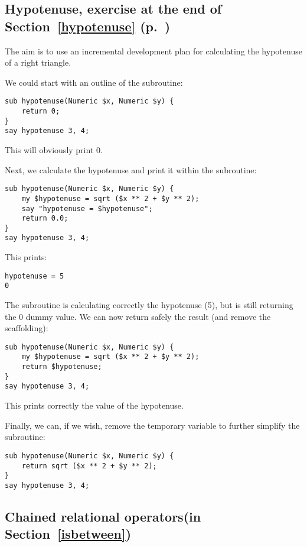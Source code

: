 \subsection{Hypotenuse, exercise at the end of Section~\ref{hypotenuse} (p.~\pageref{hypotenuse})}
\label{sol_hypotenuse}

The aim is to use an incremental development plan for 
calculating the hypotenuse of a right triangle. 

We could start with an outline of the subroutine:

\begin{verbatim}
sub hypotenuse(Numeric $x, Numeric $y) {
    return 0;
}
say hypotenuse 3, 4;
\end{verbatim}
%

This will obviously print 0.

Next, we calculate the hypotenuse and print it within the subroutine:

\begin{verbatim}
sub hypotenuse(Numeric $x, Numeric $y) {
    my $hypotenuse = sqrt ($x ** 2 + $y ** 2);
    say "hypotenuse = $hypotenuse";
    return 0.0;
}
say hypotenuse 3, 4;
\end{verbatim}
%

This prints:

\begin{verbatim}
hypotenuse = 5
0
\end{verbatim}
%

The subroutine is calculating correctly the hypotenuse (5), 
but is still returning the 0 dummy value. We can now return 
safely the result (and remove the scaffolding):

\begin{verbatim}
sub hypotenuse(Numeric $x, Numeric $y) {
    my $hypotenuse = sqrt ($x ** 2 + $y ** 2);
    return $hypotenuse;
}
say hypotenuse 3, 4;
\end{verbatim}
%

This prints correctly the value of the hypotenuse.

Finally, we can, if we wish, remove the temporary variable 
to further simplify the subroutine:
\begin{verbatim}
sub hypotenuse(Numeric $x, Numeric $y) {
    return sqrt ($x ** 2 + $y ** 2);
}
say hypotenuse 3, 4;
\end{verbatim}
%

\subsection{Chained relational operators(in Section~\ref{isbetween})}
\label{sol_isbetween}

